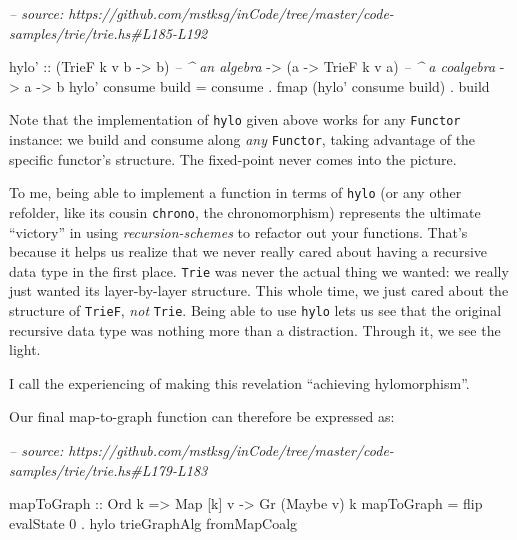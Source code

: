 \documentclass[]{article}
\newenvironment{Shaded}{}{}
\newcommand{\CommentTok}[1]{\textcolor[rgb]{0.38,0.63,0.69}{\textit{#1}}}
\newcommand{\DataTypeTok}[1]{\textcolor[rgb]{0.56,0.13,0.00}{#1}}
\newcommand{\DecValTok}[1]{\textcolor[rgb]{0.25,0.63,0.44}{#1}}
\newcommand{\FunctionTok}[1]{\textcolor[rgb]{0.02,0.16,0.49}{#1}}
\newcommand{\NormalTok}[1]{#1}
\newcommand{\OtherTok}[1]{\textcolor[rgb]{0.00,0.44,0.13}{#1}}
\begin{document}
\begin{Shaded}
\begin{Highlighting}[]
\CommentTok{-- source: https://github.com/mstksg/inCode/tree/master/code-samples/trie/trie.hs#L185-L192}

\NormalTok{hylo'}
\OtherTok{    ::}\NormalTok{ (}\DataTypeTok{TrieF}\NormalTok{ k v b }\OtherTok{->}\NormalTok{ b)   }\CommentTok{-- ^ an algebra}
    \OtherTok{->}\NormalTok{ (a }\OtherTok{->} \DataTypeTok{TrieF}\NormalTok{ k v a)   }\CommentTok{-- ^ a coalgebra}
    \OtherTok{->}\NormalTok{ a}
    \OtherTok{->}\NormalTok{ b}
\NormalTok{hylo' consume build }\FunctionTok{=}\NormalTok{ consume}
                    \FunctionTok{.}\NormalTok{ fmap (hylo' consume build)}
                    \FunctionTok{.}\NormalTok{ build}
\end{Highlighting}
\end{Shaded}

Note that the implementation of \texttt{hylo} given above works for any
\texttt{Functor} instance: we build and consume along \emph{any}
\texttt{Functor}, taking advantage of the specific functor's structure. The
fixed-point never comes into the picture.

To me, being able to implement a function in terms of \texttt{hylo} (or any
other refolder, like its cousin \texttt{chrono}, the chronomorphism) represents
the ultimate ``victory'' in using \emph{recursion-schemes} to refactor out your
functions. That's because it helps us realize that we never really cared about
having a recursive data type in the first place. \texttt{Trie} was never the
actual thing we wanted: we really just wanted its layer-by-layer structure. This
whole time, we just cared about the structure of \texttt{TrieF}, \emph{not}
\texttt{Trie}. Being able to use \texttt{hylo} lets us see that the original
recursive data type was nothing more than a distraction. Through it, we see the
light.

I call the experiencing of making this revelation ``achieving hylomorphism''.

Our final map-to-graph function can therefore be expressed as:

\begin{Shaded}
\begin{Highlighting}[]
\CommentTok{-- source: https://github.com/mstksg/inCode/tree/master/code-samples/trie/trie.hs#L179-L183}

\NormalTok{mapToGraph}
\OtherTok{    ::} \DataTypeTok{Ord}\NormalTok{ k}
    \OtherTok{=>} \DataTypeTok{Map}\NormalTok{ [k] v}
    \OtherTok{->} \DataTypeTok{Gr}\NormalTok{ (}\DataTypeTok{Maybe}\NormalTok{ v) k}
\NormalTok{mapToGraph }\FunctionTok{=}\NormalTok{ flip evalState }\DecValTok{0} \FunctionTok{.}\NormalTok{ hylo trieGraphAlg fromMapCoalg}
\end{Highlighting}
\end{Shaded}
\end{document}
